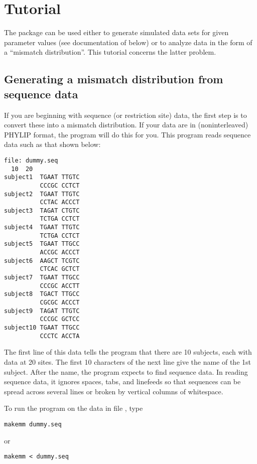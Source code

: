 \chapter{Tutorial\label{ch.tutorial}}

The package can be used either to generate simulated data sets for
given parameter values (see documentation of  below) or to
analyze data in the form of a ``mismatch distribution''.  This
tutorial concerns the latter problem.

\section{Generating a mismatch distribution from sequence data}

If you are beginning with sequence (or restriction site) data, the
first step is to convert these into a mismatch distribution.  If your
data are in (noninterleaved) PHYLIP format, the program  will
do this for you.  This program reads sequence data such as that shown
below: 
\begin{verbatim}
file: dummy.seq
  10  20
subject1  TGAAT TTGTC
          CCCGC CCTCT
subject2  TGAAT TTGTC
          CCTAC ACCCT
subject3  TAGAT CTGTC
          TCTGA CCTCT
subject4  TGAAT TTGTC
          TCTGA CCTCT
subject5  TGAAT TTGCC
          ACCGC ACCCT
subject6  AAGCT TCGTC
          CTCAC GCTCT
subject7  TGAAT TTGCC
          CCCGC ACCTT
subject8  TGACT TTGCC
          CGCGC ACCCT
subject9  TAGAT TTGTC
          CCCGC GCTCC
subject10 TGAAT TTGCC
          CCCTC ACCTA
\end{verbatim}
The first line of this data tells the program that there are 10
subjects, each with data at 20 sites.  The first 10 characters of the
next line give the name of the 1st subject.  After the name, the
program expects to find sequence data.  In reading sequence data, it
ignores spaces, tabs, and linefeeds so that sequences can be spread
across several lines or broken by vertical columns of whitespace.

To run the program on the data in file , type
\begin{verbatim}
makemm dummy.seq
\end{verbatim}
or
\begin{verbatim}
makemm < dummy.seq
\end{verbatim}

